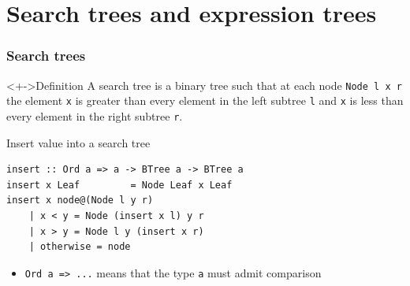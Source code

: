 \documentclass{beamer}
\begin{document}
\section{Search trees and expression trees}
\begin{frame}[fragile]
  \frametitle{Search trees}
  \begin{alertblock}<+->{Definition}
    A \alert{search tree} is a binary tree such that  at each node
    \lstinline{Node l x r} the element \lstinline{x} is greater than every element in the left
    subtree \lstinline{l} and \lstinline{x} is less than every element
    in the right subtree \lstinline{r}.
  \end{alertblock}
  \begin{block}{Insert value into a search tree}
\begin{lstlisting}
insert :: Ord a => a -> BTree a -> BTree a
insert x Leaf         = Node Leaf x Leaf
insert x node@(Node l y r)
    | x < y = Node (insert x l) y r
    | x > y = Node l y (insert x r)
    | otherwise = node
\end{lstlisting}
    \begin{itemize}
    \item \lstinline{Ord a => ...} means that the type \lstinline{a}
      must admit comparison
    \end{itemize}
  \end{block}
\end{frame}
\end{document}
